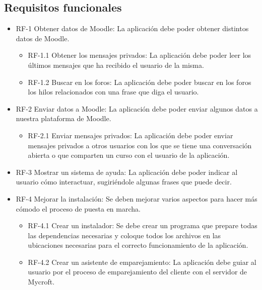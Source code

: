 \subsection{Requisitos funcionales}
\begin{itemize}
    \item RF-1 Obtener datos de Moodle: La aplicación debe poder obtener distintos datos de Moodle.
    \begin{itemize}
        \item RF-1.1 Obtener los mensajes privados: La aplicación debe poder leer los últimos mensajes que ha recibido el usuario de la misma.
        \item RF-1.2 Buscar en los foros: La aplicación debe poder buscar en los foros los hilos relacionados con una frase que diga el usuario.
    \end{itemize}
    \item RF-2 Enviar datos a Moodle: La aplicación debe poder enviar algunos datos a nuestra plataforma de Moodle.
    \begin{itemize}
        \item RF-2.1 Enviar mensajes privados: La aplicación debe poder enviar mensajes privados a otros usuarios con los que se tiene una conversación abierta o que comparten un curso con el usuario de la aplicación.
    \end{itemize}
    \item RF-3 Mostrar un sistema de ayuda: La aplicación debe poder indicar al usuario cómo interactuar, sugiriéndole algunas frases que puede decir.
    \item RF-4 Mejorar la instalación: Se deben mejorar varios aspectos para hacer más cómodo el proceso de puesta en marcha.
    \begin{itemize}
        \item RF-4.1 Crear un instalador: Se debe crear un programa que prepare todas las dependencias necesarias y coloque todos los archivos en las ubicaciones necesarias para el correcto funcionamiento de la aplicación.
        \item RF-4.2 Crear un asistente de emparejamiento: La aplicación debe guiar al usuario por el proceso de emparejamiento del cliente con el servidor de Mycroft.
    \end{itemize}
\end{itemize}

